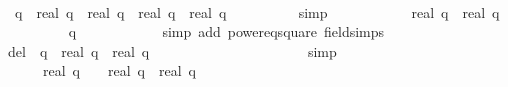 \begin{isabellebody}
\isanewline
\ \ \ \ \ \ \ \ \isamarkupfalse%
\isanewline
\ \ \ \ \ \ \isamarkupfalse%
\isanewline
\ \ \ \ \ \ \ \ \ \ \ \ \ \ \ \ \isanewline
\ \ \ \ \ \ \isamarkupfalse%
\isanewline
\isanewline
\ \ \ \ \ \ \isamarkupfalse%
\ {\isachardoublequoteopen}{\isacharquery}{\isasymDelta}\ {\isacharparenleft}q{\isacharplus}{}{\isacharparenright}\ {\isacharequal}\ {\isacharparenleft}{\isacharparenleft}real\ q{\isacharparenright}{\isacharcircum}{}\ {\isacharminus}\ {}{\isacharparenright}{\isacharslash}{\isacharparenleft}real\ q{\isacharparenright}{\isacharcircum}{}\ {\isacharminus}\ {\isacharparenleft}real\ q\ {\isacharminus}\ {}{\isacharparenright}{\isacharslash}real\ q{\isachardoublequoteclose}\isanewline
\ \ \ \ \ \ \ \ \isamarkupfalse%
\ simp\isanewline
\ \ \ \ \ \ \isamarkupfalse%
\ \isamarkupfalse%
\ {\isachardoublequoteopen}{\isachardot}{\isachardot}{\isachardot}\ {\isacharequal}\ {\isacharparenleft}real\ q\ {\isacharminus}\ {}{\isacharparenright}{\isacharslash}{\isacharparenleft}real\ q{\isacharparenright}{\isacharcircum}{}{\isachardoublequoteclose}\isanewline
\ \ \ \ \ \ \ \ \isamarkupfalse%
\ {\isacharbackquoteopen}q\ {\isasymge}\ {}{\isacharbackquoteclose}\isanewline
\ \ \ \ \ \ \ \ \isamarkupfalse%
\ {\isacharparenleft}simp\ add{\isacharcolon}\ power{}{\isacharunderscore}eq{\isacharunderscore}square\ field{\isacharunderscore}simps{\isacharparenright}\isanewline
\ \ \ \ \ \ \isamarkupfalse%
\ \isamarkupfalse%
\ del{\isacharcolon}\ {\isachardoublequoteopen}{\isasymDelta}\ {\isacharparenleft}q{\isacharplus}{}{\isacharparenright}\ {\isacharequal}\ {\isacharparenleft}real\ q\ {\isacharminus}\ {}{\isacharparenright}{\isacharslash}{\isacharparenleft}real\ q{\isacharparenright}{\isacharcircum}{}{\isachardoublequoteclose}\isanewline
\ \ \ \ \ \ \ \ \isamarkupfalse%
\ {\isacharbackquoteopen}{\isasymDelta}\ {\isacharequal}\ {\isacharquery}{\isasymDelta}{\isacharbackquoteclose}\isanewline
\ \ \ \ \ \ \ \ \isamarkupfalse%
\ simp\isanewline
\ \ \ \ \ \ \isamarkupfalse%
\ \isamarkupfalse%
\ {\isachardoublequoteopen}{\isasymDelta}\ {\isacharparenleft}{}{}{}{}\ {\isacharplus}\ {}{\isacharparenright}\ {\isasymle}\ {\isacharparenleft}real\ q\ {\isacharminus}\ {}{\isacharparenright}\ {\isacharslash}\ {\isacharparenleft}real\ q{\isacharparenright}\ {\isacharasterisk}\ real\ {\isacharparenleft}q\ {\isacharplus}\ {}{\isacharparenright}\ {\isacharslash}\ {}{}{}{}{\isachardoublequoteclose}\isanewline

\end{isabellebody}
